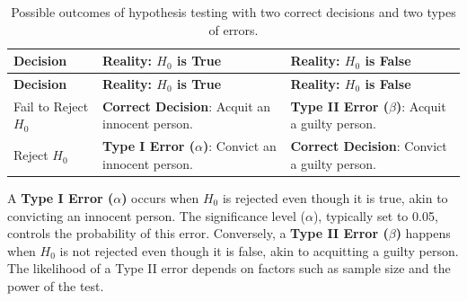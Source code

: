 \documentclass[
]{book}
\theoremstyle{definition}
\theoremstyle{definition}
\theoremstyle{definition}
\theoremstyle{definition}
\theoremstyle{remark}
\begin{document}
\begin{longtable}[]{@{}
  >{\raggedright\arraybackslash}p{}
  >{\raggedright\arraybackslash}p{}
  >{\raggedright\arraybackslash}p{}@{}}
\caption{\label{tab:hypothesis-errors} Possible outcomes of hypothesis testing with two correct decisions and two types of errors.}\tabularnewline
\toprule\noalign{}
\begin{minipage}[b]{\linewidth}\raggedright
\textbf{Decision}
\end{minipage} & \begin{minipage}[b]{\linewidth}\raggedright
\textbf{Reality: \(H_0\) is True}
\end{minipage} & \begin{minipage}[b]{\linewidth}\raggedright
\textbf{Reality: \(H_0\) is False}
\end{minipage} \\
\midrule\noalign{}
\endfirsthead
\toprule\noalign{}
\begin{minipage}[b]{\linewidth}\raggedright
\textbf{Decision}
\end{minipage} & \begin{minipage}[b]{\linewidth}\raggedright
\textbf{Reality: \(H_0\) is True}
\end{minipage} & \begin{minipage}[b]{\linewidth}\raggedright
\textbf{Reality: \(H_0\) is False}
\end{minipage} \\
\midrule\noalign{}
\endhead
\bottomrule\noalign{}
\endlastfoot
Fail to Reject \(H_0\) & {\textbf{Correct Decision}: Acquit an innocent person.} & {\textbf{Type II Error (\(\beta\))}: Acquit a guilty person.} \\
Reject \(H_0\) & {\textbf{Type I Error (\(\alpha\))}: Convict an innocent person.} & {\textbf{Correct Decision}: Convict a guilty person.} \\
\end{longtable}

A \textbf{Type I Error (\(\alpha\))} occurs when \(H_0\) is rejected even though it is true, akin to convicting an innocent person. The significance level (\(\alpha\)), typically set to 0.05, controls the probability of this error. Conversely, a \textbf{Type II Error (\(\beta\))} happens when \(H_0\) is not rejected even though it is false, akin to acquitting a guilty person. The likelihood of a Type II error depends on factors such as sample size and the power of the test.
\end{document}

